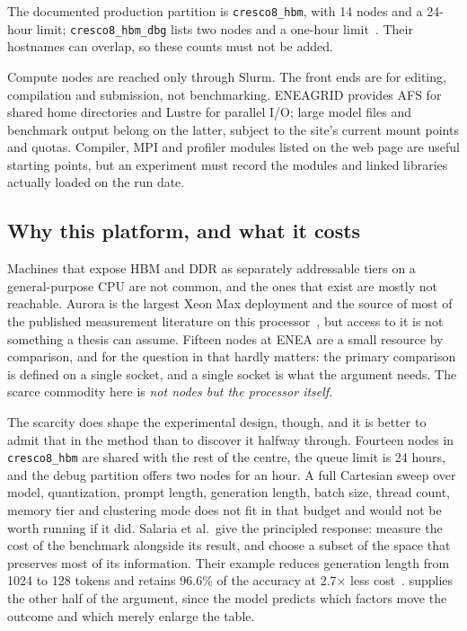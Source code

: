 The documented production partition is \texttt{cresco8\_hbm}, with 14
nodes and a 24-hour limit; \texttt{cresco8\_hbm\_dbg} lists two nodes
and a one-hour limit~\cite{cresco8doc}.  Their hostnames can overlap, so
these counts must not be added.

Compute nodes are reached only through Slurm.  The front ends are for
editing, compilation and submission, not benchmarking.  ENEAGRID
provides AFS for shared home directories and Lustre for parallel I/O;
large model files and benchmark output belong on the latter, subject to
the site's current mount points and quotas.  Compiler, MPI and profiler
modules listed on the web page are useful starting points, but an
experiment must record the modules and linked libraries actually loaded
on the run date.

\subsection{Why this platform, and what it costs}
\label{sec:why-cresco8}

Machines that expose HBM and DDR as separately addressable tiers on a
general-purpose CPU are not common, and the ones that exist are mostly
not reachable.  Aurora is the largest Xeon Max deployment and the source
of most of the published measurement literature on this
processor~\cite{ibeid2025aurora,goto2026aurorahpl}, but access to it is
not something a thesis can assume.  Fifteen nodes at ENEA are a small
resource by comparison, and for the question in
 that hardly matters: the primary
comparison is defined on a single socket, and a single socket is what
the argument needs.  The scarce commodity here is \emph{not nodes but the processor
itself}.

The scarcity does shape the experimental design, though, and it is
better to admit that in the method than to discover it halfway through.
Fourteen nodes in \texttt{cresco8\_hbm} are shared with the rest of the
centre, the queue limit is 24 hours, and the debug partition offers two
nodes for an hour.  A full Cartesian sweep over model, quantization,
prompt length, generation length, batch size, thread count, memory tier
and clustering mode does not fit in that budget and would not be worth
running if it did.  Salaria et al.\ give the principled response:
measure the cost of the benchmark alongside its result, and choose a
subset of the space that preserves most of its information.  Their
example reduces generation length from 1024 to 128 tokens and retains
96.6\% of the accuracy at 2.7$\times$ less
cost~\cite{salaria2025metametrics}.  
supplies the other half of the argument, since the model predicts which
factors move the outcome and which merely enlarge the table.

